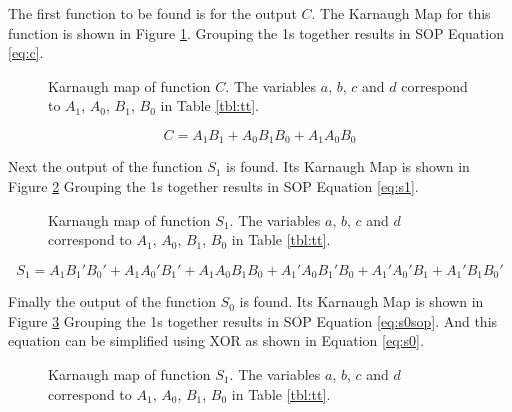 \documentclass[12pt]{article}
\begin{document}
The first function to be found is for the output $C$.
The Karnaugh Map for this function is shown in Figure \ref{fig:kmc}.
Grouping the 1s together results in SOP Equation \ref{eq:c}.

\begin{figure}
\begin{center}
\end{center}
\caption{Karnaugh map of function $C$.
The variables $a$, $b$, $c$ and $d$ correspond to
$A_1$, $A_0$, $B_1$, $B_0$ in Table \ref{tbl:tt}.}
\label{fig:kmc}
\end{figure}

\begin{equation}
C = A_1 B_1 + A_0 B_1 B_0 + A_1 A_0 B_0 \label{eq:c}
\end{equation}

Next the output of the function $S_1$ is found.
Its Karnaugh Map is shown in Figure \ref{fig:kms1}
Grouping the 1s together results in SOP Equation \ref{eq:s1}.

\begin{figure}
\begin{center}
\end{center}
\caption{Karnaugh map of function $S_1$.
The variables $a$, $b$, $c$ and $d$ correspond to
$A_1$, $A_0$, $B_1$, $B_0$ in Table \ref{tbl:tt}.}
\label{fig:kms1}
\end{figure}

\begin{equation}
S_1 = A_1 B_1' B_0'
	+ A_1 A_0' B_1'
	+ A_1 A_0 B_1 B_0
	+ A_1' A_0 B_1' B_0
	+ A_1' A_0' B_1
	+ A_1' B_1 B_0' \label{eq:s1}
\end{equation}

Finally the output of the function $S_0$ is found.
Its Karnaugh Map is shown in Figure \ref{fig:kms0}
Grouping the 1s together results in SOP Equation \ref{eq:s0sop}.
And this equation can be simplified using XOR as shown in Equation \ref{eq:s0}.

\begin{figure}
\begin{center}
\end{center}
\caption{Karnaugh map of function $S_1$.
The variables $a$, $b$, $c$ and $d$ correspond to
$A_1$, $A_0$, $B_1$, $B_0$ in Table \ref{tbl:tt}.}
\label{fig:kms0}
\end{figure}
\end{document}
